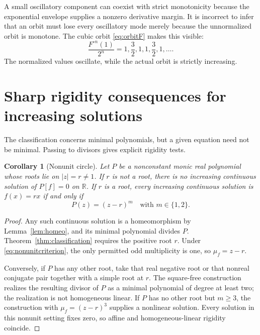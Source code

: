 \documentclass[11pt,letterpaper]{article}
\newtheorem{corollary}[theorem]{Corollary}
\theoremstyle{definition}
\theoremstyle{remark}
\newcommand{\R}{\mathbb R}
\newcommand{\itn}[2]{#1^{\circ #2}}
\begin{document}
A small oscillatory component can coexist with strict monotonicity
because the exponential envelope supplies a nonzero derivative margin.
It is incorrect to infer that an orbit must lose every oscillatory mode
merely because the unnormalized orbit is monotone. The cubic orbit
\eqref{eq:orbitF} makes this visible:
\begin{equation}
 \frac{\itn{F}{n}(1)}{2^n}
   =1,\frac32,1,1,\frac32,1,\ldots.
\end{equation}
The normalized values oscillate, while the actual orbit is strictly
increasing.

\section{Sharp rigidity consequences for increasing solutions}
\label{sec:rigidity}

The classification concerns minimal polynomials, but a given equation
need not be minimal. Passing to divisors gives explicit rigidity tests.

\begin{corollary}[Nonunit circle]
\label{cor:nonunitrigidity}
Let $P$ be a nonconstant monic real polynomial whose roots lie on
$|z|=r\ne1$. If $r$ is not a root, there is no increasing continuous
solution of $P[f]=0$ on $\R$. If $r$ is a root, every increasing continuous
solution is $f(x)=rx$ if and only if
\begin{equation}
  P(z)=(z-r)^m\quad\text{with }m\in\{1,2\}.
  \label{eq:nonunitcriterion}
\end{equation}
\end{corollary}

\begin{proof}
Any such continuous solution is a homeomorphism by
Lemma~\ref{lem:homeo}, and its minimal polynomial divides $P$.
Theorem~\ref{thm:classification} requires the positive root $r$.
Under \eqref{eq:nonunitcriterion}, the only permitted odd multiplicity
is one, so $\mu_f=z-r$.

Conversely, if $P$ has any other root, take that real negative root or
that nonreal conjugate pair together with a simple root at $r$.
The square-free construction realizes the resulting divisor of $P$ as
a minimal polynomial of degree at least two; the realization is not
homogeneous linear. If $P$ has no other root but $m\ge3$, the construction
with $\mu_f=(z-r)^3$ supplies a nonlinear solution. Every solution in
this nonunit setting fixes zero, so affine and homogeneous-linear
rigidity coincide.
\end{proof}
\end{document}
